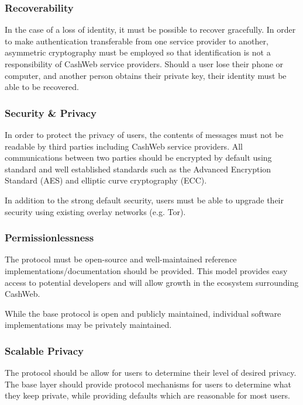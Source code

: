 \documentclass{article}
\begin{document}
\subsubsection{Recoverability}

In the case of a loss of identity, it must be possible to recover gracefully. In order to make authentication transferable from one service provider to another, asymmetric cryptography must be employed so that identification is not a responsibility of CashWeb service providers. Should a user lose their phone or computer, and another person obtains their private key, their identity must be able to be recovered.

\subsubsection{Security \& Privacy}

In order to protect the privacy of users, the contents of messages must not be readable by third parties including CashWeb service providers. All communications between two parties should be encrypted by default using standard and well established standards such as the Advanced Encryption Standard (AES) and elliptic curve cryptography (ECC).

In addition to the strong default security, users must be able to upgrade their security using existing overlay networks (e.g. Tor).

\subsubsection{Permissionlessness}

The protocol must be open-source and well-maintained reference implementations/documentation should be provided. This model provides easy access to potential developers and will allow growth in the ecosystem surrounding CashWeb.

While the base protocol is open and publicly maintained, individual software implementations may be privately maintained.

\subsubsection{Scalable Privacy}

The protocol should be allow for users to determine their level of desired privacy. The base layer should provide protocol mechanisms for users to determine what they keep private, while providing defaults which are reasonable for most users.
\end{document}
